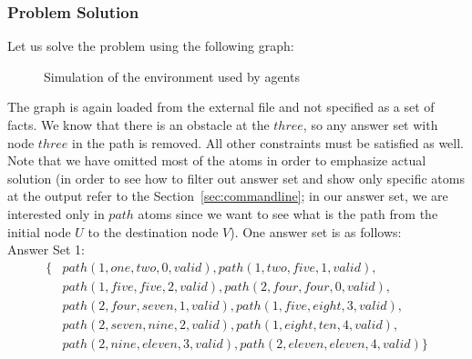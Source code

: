 \documentclass[a4paper, titlepage]{article}
\begin{document}
\subsubsection{Problem Solution} 
Let us solve the problem using the following graph:  
\begin{figure}
\begin{center}
\end{center}
\caption{Simulation of the environment used by agents}
\end{figure}
The graph is again loaded from the external file and not 
specified as a set of facts. We know that there is an obstacle at the $\mathit{three}$, so any answer set with node 
$\mathit{three}$ in the path is removed. All other 
constraints must be satisfied as well. Note that we have 
omitted most of the atoms in order to emphasize actual 
solution (in order to see how to filter out answer set and 
show only specific atoms at the output refer to the 
Section~\ref{sec:commandline}; in our answer set, we are 
interested only in $\mathit{path}$ atoms since we want to 
see what is the path from the initial node $U$ to the 
destination node $V$). One answer set is as follows:
\\Answer Set 1:
\begin{align*}
\{ & path(1,one,two,0,valid), path(1,two,five,1,valid),
\\ & path(1,five,five,2,valid), path(2,four,four,0,valid),
\\ & path(2,four,seven,1,valid), 
path(1,five,eight,3,valid),
\\ & path(2,seven,nine,2,valid), path(1,eight,ten,4,valid),
\\ & 
path(2,nine,eleven,3,valid),path(2,eleven,eleven,4,valid) 
\}
\end{align*} 
\end{document}
